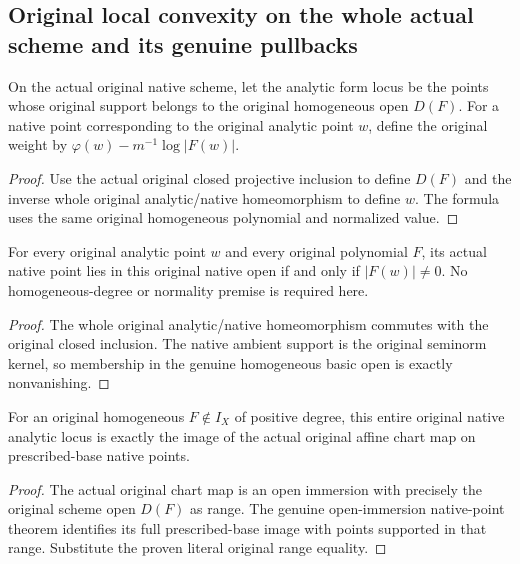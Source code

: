 \subsection{Original local convexity on the whole actual scheme and its genuine pullbacks}

\begin{definition}
\label{projective:actual-original-native-admissible-weight}
\leanok
{}
On the actual original native scheme, let the analytic form locus be the
points whose original support belongs to the original homogeneous open
$D(F)$. For a native point corresponding to the original analytic point $w$,
define the original weight by $\varphi(w)-m^{-1}\log|F(w)|$.
\end{definition}
\begin{proof}
Use the actual original closed projective inclusion to define $D(F)$ and
the inverse whole original analytic/native homeomorphism to define $w$.
The formula uses the same original homogeneous polynomial and normalized value.
\end{proof}

\begin{lemma}
\label{projective:actual-original-native-form-open}
\leanok
{}
For every original analytic point $w$ and every original polynomial $F$,
its actual native point lies in this original native open if and only if
$|F(w)|\ne0$. No homogeneous-degree or normality premise is required here.
\end{lemma}
\begin{proof}
The whole original analytic/native homeomorphism commutes with the original
closed inclusion. The native ambient support is the original seminorm kernel,
so membership in the genuine homogeneous basic open is exactly nonvanishing.
\end{proof}

\begin{lemma}
\label{projective:actual-original-native-chart-range}
\leanok
{}
For an original homogeneous $F\notin I_X$ of positive degree, this entire
original native analytic locus is exactly the image of the actual original
affine chart map on prescribed-base native points.
\end{lemma}
\begin{proof}
The actual original chart map is an open immersion with precisely the original
scheme open $D(F)$ as range. The genuine open-immersion native-point theorem
identifies its full prescribed-base image with points supported in that range.
Substitute the proven literal original range equality.
\end{proof}

